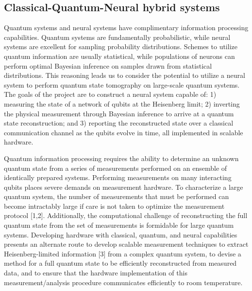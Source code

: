 \documentclass[twocolumn]{article}
\begin{document}
\subsection{Classical-Quantum-Neural hybrid systems}
Quantum systems and neural systems have complimentary information processing capabilities. Quantum systems are fundamentally probabilistic, while neural systems are excellent for sampling probability distributions. Schemes to utilize quantum information are usually statistical, while populations of neurons can perform optimal Bayesian inference on samples drawn from statistical distributions. This reasoning leads us to consider the potential to utilize a neural system to perform quantum state tomography on large-scale quantum systems. The goals of the project are to construct a neural system capable of: 1) measuring the state of a network of qubits at the Heisenberg limit; 2) inverting the physical measurement through Bayesian inference to arrive at a quantum state reconstruction; and 3) reporting the reconstructed state over a classical communication channel as the qubits evolve in time, all implemented in scalable hardware.

Quantum information processing requires the ability to determine an unknown quantum state from a series of measurements performed on an ensemble of identically prepared systems. Performing measurements on many interacting qubits places severe demands on measurement hardware. To characterize a large quantum system, the number of measurements that must be performed can become intractably large if care is not taken to optimize the measurement protocol [1,2]. Additionally, the computational challenge of reconstructing the full quantum state from the set of measurements is formidable for large quantum systems. Developing hardware with classical, quantum, and neural capabilities presents an alternate route to develop scalable measurement techniques to extract Heisenberg-limited information [3] from a complex quantum system, to devise a method for a full quantum state to be efficiently reconstructed from measured data, and to ensure that the hardware implementation of this measurement/analysis procedure communicates efficiently to room temperature. 
\end{document}

